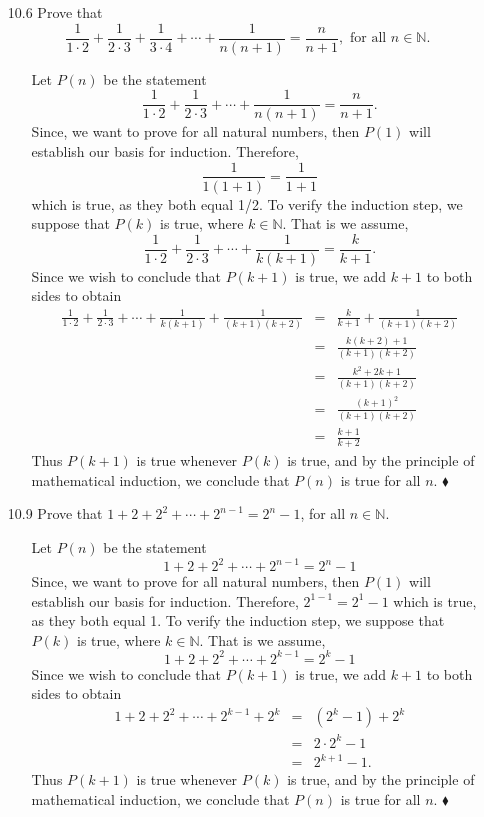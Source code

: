 \documentclass[12pt]{article}
\begin{document}
\begin{enumerate}
\item[10.6] Prove that 
\[
\frac{1}{1 \cdot 2} + \frac{1}{2 \cdot 3} + \frac{1}{3 \cdot 4} + \cdots + \frac{1}{n(n+1)} = 
\frac{n}{n+1}, \mbox{ for all $n \in \mathbb{N}$.}
\]
\begin{enumerate}
\item[] Let $P(n)$ be the statement \[
\frac{1}{1 \cdot 2} + \frac{1}{2 \cdot 3} + \cdots + \frac{1}{n(n + 1)} = \frac{n}{n + 1}.
\]
Since, we want to prove for all natural numbers, then $P(1)$ will establish our
basis for induction. Therefore, \[ \frac{1}{1(1 + 1)} = \frac{1}{1 + 1} \] which is true, as they both
equal 1/2. To verify the induction step, we suppose that $P(k)$ is true, where $k \in \mathbb{N}$.
That is we assume, \[
\frac{1}{1 \cdot 2} + \frac{1}{2 \cdot 3} + \cdots + \frac{1}{k(k + 1)} = \frac{k}{k + 1}.
\]
Since we wish to conclude that $P(k + 1)$ is true, we add $k + 1$ to both sides to obtain
\begin{eqnarray*}
\frac{1}{1 \cdot 2} + \frac{1}{2 \cdot 3} + \cdots + \frac{1}{k(k + 1)} + \frac{1}{(k + 1)(k + 2)} 
&=& \frac{k}{k + 1} + \frac{1}{(k + 1)(k + 2)} \\
&=& \frac{k(k + 2) + 1}{(k + 1)(k + 2)} \\
&=& \frac{k^2 + 2k + 1}{(k + 1)(k + 2)} \\
&=& \frac{(k + 1)^2}{(k + 1)(k + 2)} \\
&=& \frac{k + 1}{k + 2} 
\end{eqnarray*}
Thus $P(k + 1)$ is true whenever $P(k)$ is true, and by the principle of 
mathematical induction, we conclude that $P(n)$ is true for all $n$. $\blacklozenge$
\end{enumerate}

\item[10.9] Prove that $1 + 2 + 2^2 + \cdots + 2^{n-1} = 2^n - 1$, for all $n \in \mathbb{N}$.
\begin{enumerate}
\item[] Let $P(n)$ be the statement \[
1 + 2 + 2^2 + \cdots + 2^{n - 1} = 2^n - 1
\]
Since, we want to prove for all natural numbers, then $P(1)$ will establish our
basis for induction. Therefore, $2^{1 - 1} = 2^1 - 1$ which is true, as they both
equal 1. To verify the induction step, we suppose that $P(k)$ is true, where $k \in \mathbb{N}$.
That is we assume, \[
1 + 2 + 2^2 + \cdots + 2^{k - 1} = 2^k - 1
\]
Since we wish to conclude that $P(k + 1)$ is true, we add $k + 1$ to both sides to obtain
\begin{eqnarray*}
1 + 2 + 2^2 + \cdots + 2^{k - 1} + 2^k &=&  (2^k - 1) + 2^k \\
&=& 2 \cdot 2^k - 1 \\
&=& 2^{k + 1} - 1.
\end{eqnarray*}
Thus $P(k + 1)$ is true whenever $P(k)$ is true, and by the principle of 
mathematical induction, we conclude that $P(n)$ is true for all $n$. $\blacklozenge$
\end{enumerate}


\end{enumerate}
\end{document}
